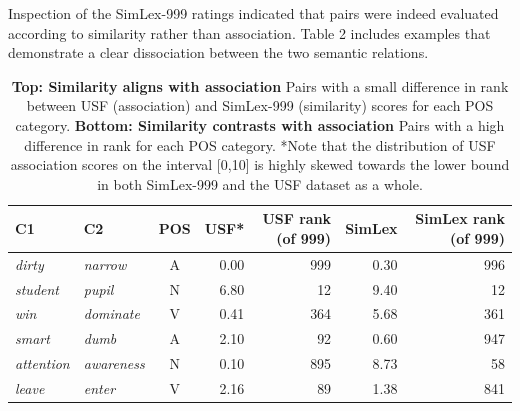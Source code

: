 \documentclass[fullname]{clv2}
\begin{document}
Inspection of the SimLex-999 ratings indicated that pairs were indeed evaluated according to similarity rather than association. Table 2 includes examples that demonstrate a clear dissociation between the two semantic relations. 



 \begin{table}[t]\begin{center}\begin{tabular}{l|l|c|r|r|r|r}





C1 & C2 & POS & USF* & USF rank (of 999) & SimLex & SimLex rank (of 999) \\



\hline \emph{dirty} & \emph{narrow} & A & 0.00 & 999 & 0.30 & 996 \\



\emph{student} & \emph{pupil} & N & 6.80 & 12 & 9.40 & 12 \\

\emph{win} & \emph{dominate} & V & 0.41 & 364 & 5.68 & 361 \\



\hdashline \emph{smart} & \emph{dumb} & A & 2.10 & 92 & 0.60 & 947 \\

\emph{attention} & \emph{awareness} & N &  0.10 & 895 & 8.73 & 58 \\

\emph{leave} & \emph{enter} & V & 2.16 & 89 & 1.38 & 841 \\
\end{tabular}
\end{center}\caption{\label{font-table} {\bf Top:  Similarity aligns with association} Pairs with a small difference in rank between USF (association) and SimLex-999 (similarity) scores for each POS category. {\bf Bottom: Similarity contrasts with association} Pairs with a high difference in rank for each POS category. *Note that the distribution of USF association scores on the interval [0,10] is highly skewed towards the lower bound in both SimLex-999 and the USF dataset as a whole.}\end{table}
\end{document}
